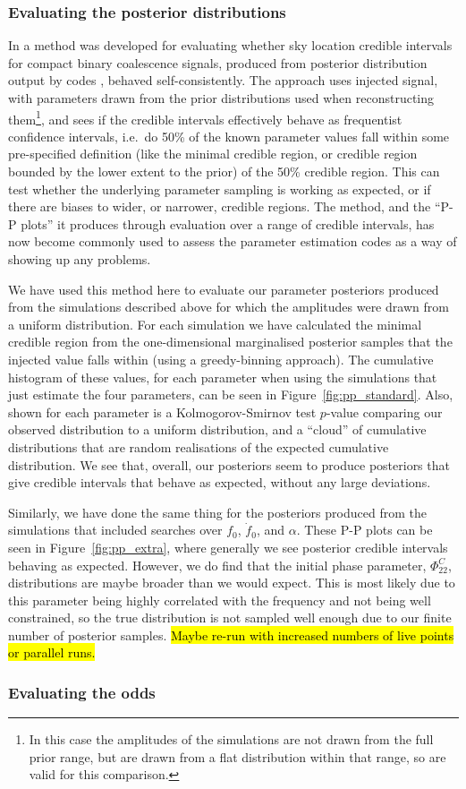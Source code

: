 \subsubsection{Evaluating the posterior distributions}\label{sec:ppplots}

In \citet{2014PhRvD..89h4060S} a method was developed for evaluating whether sky location credible intervals for compact binary coalescence \gw signals, produced
from posterior distribution output by \lalinf codes \citep{2015PhRvD..91d2003V}, behaved self-consistently. The approach uses injected signal, with parameters
drawn from the prior distributions used when reconstructing them\footnote{In this case the amplitudes of the simulations are not drawn from the full prior range,
but are drawn from a flat distribution within that range, so are valid for this comparison.}, and sees if the credible intervals effectively behave as frequentist
confidence intervals, i.e.\ do 50\% of the known parameter values fall within some pre-specified definition (like the minimal credible region, or credible
region bounded by the lower extent to the prior) of the 50\% credible region. This can test whether the underlying \lalinf parameter sampling is working as
expected, or if there are biases to wider, or narrower, credible regions. The method, and the ``P-P plots'' it produces through evaluation over a range of credible
intervals, has now become commonly used to assess the \lalinf parameter estimation codes \citep{2015PhRvD..91d2003V} as a way of showing up any problems.

We have used this method here to evaluate our parameter posteriors produced from the simulations described above for which the amplitudes were drawn from
a uniform distribution. For each simulation we have calculated the minimal credible region from the one-dimensional marginalised posterior samples that the
injected value falls within (using a greedy-binning approach). The cumulative histogram of these values, for each parameter when using the simulations that
just estimate the four \gw parameters, can be seen in Figure~\ref{fig:pp_standard}. Also, shown for each parameter is a Kolmogorov-Smirnov test $p$-value
comparing our observed distribution to a uniform distribution, and a ``cloud'' of cumulative distributions that are random realisations of the expected
cumulative distribution. We see that, overall, our posteriors seem to produce posteriors that give credible intervals that behave as expected, without any
large deviations.

Similarly, we have done the same thing for the posteriors produced from the simulations that included searches over $f_0$, $\dot{f}_0$, and $\alpha$. These
P-P plots can be seen in Figure~\ref{fig:pp_extra}, where generally we see posterior credible intervals behaving as expected. However, we do find that the
initial phase parameter, $\Phi_{22}^C$, distributions are maybe broader than we would expect. This is most likely due to this parameter being highly
correlated with the frequency and not being well constrained, so the true distribution is not sampled well enough due to our finite number of posterior samples.
\hl{Maybe re-run with increased numbers of live points or parallel runs.}

\subsubsection{Evaluating the odds}\label{sec:evalodds}
